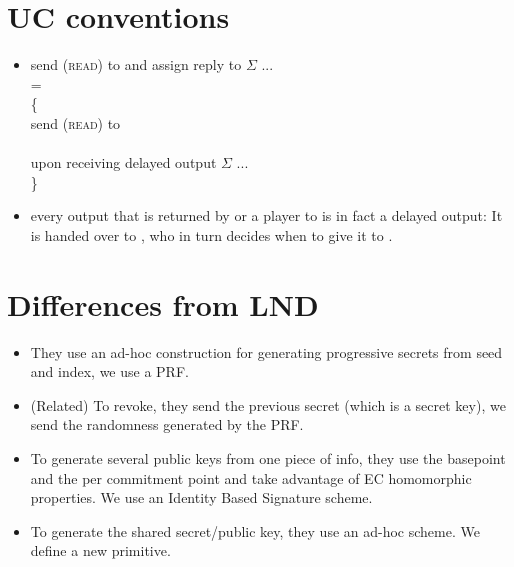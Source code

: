 \section{UC conventions}
  \begin{itemize}
    \item send (\textsc{read}) to \ledger{} and assign reply to $\Sigma$ ... \\
    = \\
    \{ \\
    send (\textsc{read}) to \ledger{} \\ \ \\
    upon receiving delayed output $\Sigma$ ... \\
    \}
    \item every output that is returned by \fpaynet{} or a player to
    \environment{} is in fact a delayed output: It is handed over to
    \adversary{}, who in turn decides when to give it to \environment{}.
  \end{itemize}

\section{Differences from LND}
  \begin{itemize}
    \item They use an ad-hoc construction for generating progressive secrets
    from seed and index, we use a PRF.
    \item (Related) To revoke, they send the previous secret (which is a secret
    key), we send the randomness generated by the PRF.
    \item To generate several public keys from one piece of info, they use the
    basepoint and the per commitment point and take advantage of EC homomorphic
    properties. We use an Identity Based Signature scheme.
    \item To generate the shared secret/public key, they use an ad-hoc scheme.
    We define a new primitive.
  \end{itemize}
